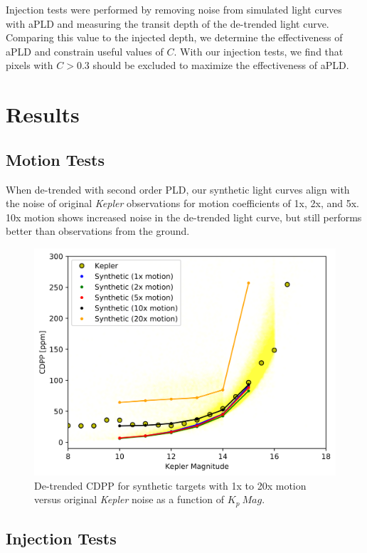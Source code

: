 \documentclass[12pt,preprint]{emulateapj}
\begin{document}
Injection tests were performed by removing noise from simulated light curves with aPLD and measuring the transit depth of the de-trended light curve. Comparing this value to the injected depth, we determine the effectiveness of aPLD and constrain useful values of $C$. With our injection tests, we find that pixels with $C>0.3$ should be excluded to maximize the effectiveness of aPLD.

\section{Results}

\subsection{Motion Tests}

When de-trended with second order PLD, our synthetic light curves align with the noise of original \textit{Kepler} observations for motion coefficients of 1x, 2x, and 5x. 10x motion shows increased noise in the de-trended light curve, but still performs better than observations from the ground.

\begin{figure}[h]
	\centering
	\includegraphics[width=1.0\linewidth]{detmotion.png}
	\caption{De-trended CDPP for synthetic targets with 1x to 20x motion versus original \textit{Kepler} noise as a function of $K_p\ Mag$.}
	\label{fig:detmotion}
\end{figure}

\subsection{Injection Tests}
\end{document}
